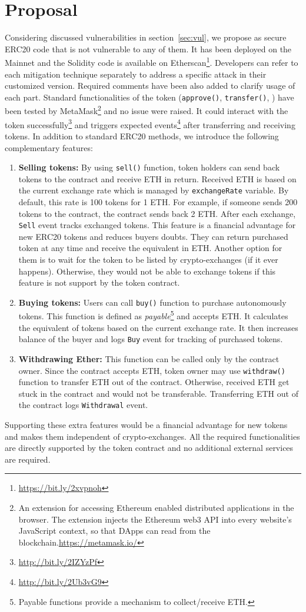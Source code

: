 
\section{Proposal}\label{sec:proposal}
Considering discussed vulnerabilities in section~\ref{sec:vul}, we propose as secure ERC20 code that is not vulnerable to any of them. It has been deployed on the Mainnet and the Solidity code is available on Etherscan\footnote{\url{https://bit.ly/2xvpnoh}}. Developers can refer to each mitigation technique separately to address a specific attack in their customized version. Required comments have been also added to clarify usage of each part. Standard functionalities of the token (\ie \texttt{approve()}, \texttt{transfer()}, \etc) have been tested by MetaMask\footnote{An extension for accessing Ethereum enabled distributed applications in the browser. The extension injects the Ethereum web3 API into every website's JavaScript context, so that DApps can read from the blockchain.\url{https://metamask.io/}} and no issue were raised. It could interact with the token successfully\footnote{\url{http://bit.ly/2IZYzPf}} and triggers expected events\footnote{\url{http://bit.ly/2Ub3vG9}} after transferring and receiving tokens. In addition to standard ERC20 methods, we introduce the following complementary features:

\begin{enumerate}[leftmargin=*]
	\item \textbf{Selling tokens:} By using \texttt{sell()} function, token holders can send back tokens to the contract and receive ETH in return. Received ETH is based on the current exchange rate which is managed by \texttt{exchangeRate} variable. By default, this rate is 100 tokens for 1 ETH. For example, if someone sends 200 tokens to the contract, the contract sends back 2 ETH. After each exchange, \texttt{Sell} event tracks exchanged tokens. This feature is a financial advantage for new ERC20 tokens and reduces buyers doubts. They can return purchased token at any time and receive the equivalent in ETH. Another option for them is to wait for the token to be listed by crypto-exchanges (if it ever happens). Otherwise, they would not be able to exchange tokens if this feature is not support by the token contract.
	\item \textbf{Buying tokens:} Users can call \texttt{buy()} function to purchase autonomously tokens. This function is defined as \textit{payable}\footnote{Payable functions provide a mechanism to collect/receive ETH.} and accepts ETH. It calculates the equivalent of tokens based on the current exchange rate. It then increases balance of the buyer and logs \texttt{Buy} event for tracking of purchased tokens.
	\item \textbf{Withdrawing Ether:} This function can be called only by the contract owner. Since the contract accepts ETH, token owner may use \texttt{withdraw()} function to transfer ETH out of the contract. Otherwise, received ETH get stuck in the contract and would not be transferable. Transferring ETH out of the contract logs \texttt{Withdrawal} event.
\end{enumerate}

\noindent Supporting these extra features would be a financial advantage for new tokens and makes them independent of crypto-exchanges. All the required functionalities are directly supported by the token contract and no additional external services are required.